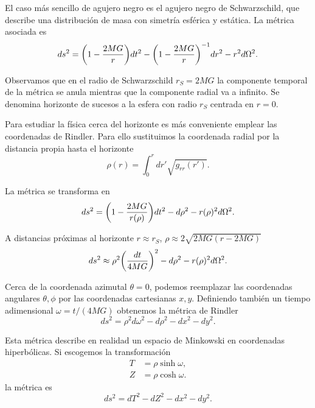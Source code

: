 








El caso más sencillo de agujero negro es el agujero negro de Schwarzschild, que
describe una distribución de masa con simetría esférica y estática. La métrica asociada
es 
\begin{equation}
  ds^2= \qty(1-\frac{2MG}{r})dt^2-\qty(1-\frac{2MG}{r})^{-1}dr^2-r^2d\Omega^2.
\end{equation}

Observamos que en el radio de Schwarzschild $r_S=2MG$ la componente temporal de la 
métrica se anula mientras que la componente radial va a infinito.
Se denomina horizonte de sucesos a la esfera con radio $r_S$ centrada en $r=0$.

Para estudiar la física cerca del horizonte es más conveniente emplear las coordenadas
de Rindler. Para ello sustituimos la coordenada radial por la distancia propia hasta
el horizonte
\begin{equation}
  \rho(r)=\int_0^r dr' \sqrt{g_{rr}(r')}.
\end{equation}

La métrica se transforma en 
\begin{equation}
  ds^2=\qty(1-\frac{2MG}{r(\rho)})dt^2-d\rho^2-r(\rho)^2d\Omega^2.
\end{equation}

A distancias próximas al horizonte $r\approx r_S$, $\rho\approx 2\sqrt{2MG(r-2MG)}$
\begin{equation}
  ds^2\approx \rho^2\qty(\frac{dt}{4MG})^2 -d\rho^2-r(\rho)^2d\Omega^2.
\end{equation}

Cerca de la coordenada azimutal $\theta=0$, podemos reemplazar las coordenadas
angulares $\theta,\phi$ por las coordenadas cartesianas $x,y$. Definiendo
también un tiempo adimensional $\omega=t/(4MG)$ obtenemos la métrica de Rindler
\begin{equation}
  ds^2=\rho^2d\omega^2 -d\rho^2 -dx^2-dy^2.
\end{equation}

Esta métrica describe en realidad un espacio de Minkowski en coordenadas hiperbólicas.
Si escogemos la transformación
\begin{align}
  T&=\rho \sinh \omega, \\
  Z&=\rho \cosh \omega.
\end{align}
la métrica es
\begin{equation}
  ds^2=dT^2-dZ^2-dx^2-dy^2.
\end{equation}

